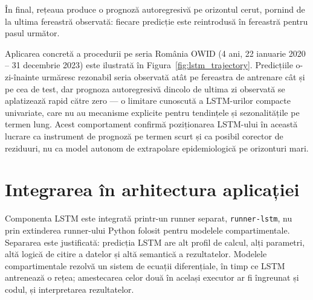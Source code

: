 În final, rețeaua produce o prognoză autoregresivă pe orizontul cerut, pornind
de la ultima fereastră observată: fiecare predicție este reintrodusă în
fereastră pentru pasul următor.

Aplicarea concretă a procedurii pe seria România OWID (4 ani, 22 ianuarie 2020
-- 31 decembrie 2023) este ilustrată în Figura~\ref{fig:lstm_trajectory}.
Predicțiile o-zi-înainte urmăresc rezonabil seria observată atât pe fereastra
de antrenare cât și pe cea de test, dar prognoza autoregresivă dincolo de
ultima zi observată se aplatizează rapid către zero --- o limitare cunoscută
a LSTM-urilor compacte univariate, care nu au mecanisme explicite pentru
tendințele și sezonalitățile pe termen lung. Acest comportament confirmă
poziționarea LSTM-ului în această lucrare ca instrument de prognoză pe
termen scurt și ca posibil corector de reziduuri, nu ca model autonom de
extrapolare epidemiologică pe orizonturi mari.



\section{Integrarea în arhitectura aplicației}
\label{sec:arhitectura_lstm}

Componenta LSTM este integrată printr-un runner separat, \texttt{runner-lstm}, nu
prin extinderea runner-ului Python folosit pentru modelele compartimentale.
Separarea este justificată: predicția LSTM are alt profil de calcul, alți
parametri, altă logică de citire a datelor și altă semantică a rezultatelor.
Modelele compartimentale rezolvă un sistem de ecuații diferențiale, în timp ce
LSTM antrenează o rețea; amestecarea celor două în același executor ar fi
îngreunat și codul, și interpretarea rezultatelor.

